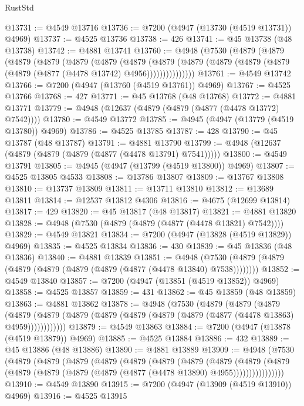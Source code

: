 \begin{lexlean}{RustStd}
\begin{coremodule}
{\begin{coremodule}
{{{{{{{{{{{{{{{{{{{{{{{{{{{{{{{{{{{{{{{{{{{{{{{{{{{{{{{{{{{{@13731 := @4549 @13716
@13736 := @7200 (@4947 (@13730 (@4519 @13731)) @4969)
@13737 := @4525 @13736
@13738 := 426
@13741 := @45 @13738 (@48 @13738)
@13742 := @4881 @13741
@13760 := @4948
    (@7530
      (@4879
        (@4879
          (@4879
            (@4879
              (@4879
                (@4879
                  (@4879
                    (@4879
                      (@4879 (@4879 (@4879 (@4879 (@4879 (@4877 (@4478 @13742) @4956)))))))))))))))
@13761 := @4549 @13742
@13766 := @7200 (@4947 (@13760 (@4519 @13761)) @4969)
@13767 := @4525 @13766
@13768 := 427
@13771 := @45 @13768 (@48 @13768)
@13772 := @4881 @13771
@13779 := @4948 (@12637 (@4879 (@4879 (@4877 (@4478 @13772) @7542))))
@13780 := @4549 @13772
@13785 := @4945 (@4947 (@13779 (@4519 @13780)) @4969)
@13786 := @4525 @13785
@13787 := 428
@13790 := @45 @13787 (@48 @13787)
@13791 := @4881 @13790
@13799 := @4948 (@12637 (@4879 (@4879 (@4879 (@4877 (@4478 @13791) @7541)))))
@13800 := @4549 @13791
@13805 := @4945 (@4947 (@13799 (@4519 @13800)) @4969)
@13807 := @4525 @13805 @4533
@13808 := @13786 @13807
@13809 := @13767 @13808
@13810 := @13737 @13809
@13811 := @13711 @13810
@13812 := @13689 @13811
@13814 := @12537 @13812 @4306
@13816 := @4675 (@12699 @13814)
@13817 := 429
@13820 := @45 @13817 (@48 @13817)
@13821 := @4881 @13820
@13828 := @4948 (@7530 (@4879 (@4879 (@4877 (@4478 @13821) @7542))))
@13829 := @4549 @13821
@13834 := @7200 (@4947 (@13828 (@4519 @13829)) @4969)
@13835 := @4525 @13834
@13836 := 430
@13839 := @45 @13836 (@48 @13836)
@13840 := @4881 @13839
@13851 := @4948 (@7530 (@4879 (@4879 (@4879 (@4879 (@4879 (@4879 (@4877 (@4478 @13840) @7538))))))))
@13852 := @4549 @13840
@13857 := @7200 (@4947 (@13851 (@4519 @13852)) @4969)
@13858 := @4525 @13857
@13859 := 431
@13862 := @45 @13859 (@48 @13859)
@13863 := @4881 @13862
@13878 := @4948
    (@7530
      (@4879
        (@4879
          (@4879
            (@4879 (@4879 (@4879 (@4879 (@4879 (@4879 (@4879 (@4877 (@4478 @13863) @4959))))))))))))
@13879 := @4549 @13863
@13884 := @7200 (@4947 (@13878 (@4519 @13879)) @4969)
@13885 := @4525 @13884
@13886 := 432
@13889 := @45 @13886 (@48 @13886)
@13890 := @4881 @13889
@13909 := @4948
    (@7530
      (@4879
        (@4879
          (@4879
            (@4879
              (@4879
                (@4879
                  (@4879
                    (@4879
                      (@4879
                        (@4879
                          (@4879 (@4879 (@4879 (@4879 (@4877 (@4478 @13890) @4955))))))))))))))))
@13910 := @4549 @13890
@13915 := @7200 (@4947 (@13909 (@4519 @13910)) @4969)
@13916 := @4525 @13915
}}}}}}}}}}}}}}}}}}}}}}}}}}}}}}}}}}}}}}}}}}}}}}}}}}}}}}}}}}}}
\end{coremodule}}
\end{coremodule}
\end{lexlean}
